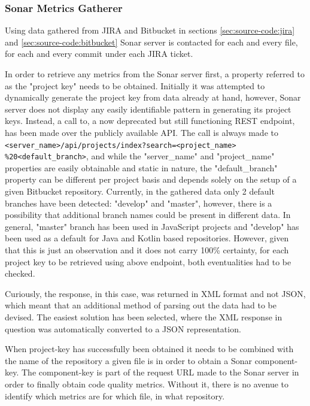 \subsubsection{Sonar Metrics Gatherer}\label{sec:source-code:sonar-metrics}
Using data gathered from JIRA and Bitbucket in sections \ref{sec:source-code:jira} and \ref{sec:source-code:bitbucket} Sonar server is contacted for each and every file, for each and every commit under each JIRA ticket. 

In order to retrieve any metrics from the Sonar server first, a property referred to as the "project key" needs to be obtained. Initially it was attempted to dynamically generate the project key from data already at hand, however, Sonar server does not display any easily identifiable pattern in generating its project keys. Instead, a call to, a now deprecated but still functioning REST endpoint, has been made over the publicly available API. 
The call is always made to \texttt{<server_name>/api/projects/index?search=<project_name> \%20<default_branch>}, and while the "server\_name" and "project\_name" properties are easily obtainable and static in nature, the "default\_branch" property can be different per project basis and depends solely on the setup of a given Bitbucket repository. Currently, in the gathered data only 2 default branches have been detected: "develop" and "master", however, there is a possibility that additional branch names could be present in different data. In general, "master" branch has been used in JavaScript projects and "develop" has been used as a default for Java and Kotlin based repositories. However, given that this is just an observation and it does not carry 100\% certainty, for each project key to be retrieved using above endpoint, both eventualities had to be checked. 

Curiously, the response, in this case, was returned in XML format and not JSON, which meant that an additional method of parsing out the data had to be devised. 
The easiest solution has been selected, where the XML response in question was automatically converted to a JSON representation. 

When project-key has successfully been obtained it needs to be combined with the name of the repository a given file is in order to obtain a Sonar component-key. The component-key is part of the request URL made to the Sonar server in order to finally obtain code quality metrics. Without it, there is no avenue to identify which metrics are for which file, in what repository.

